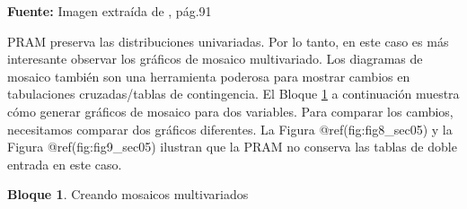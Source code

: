 \documentclass[
]{book}
\theoremstyle{definition}
\theoremstyle{definition}
\newtheorem{example}{Bloque}[chapter]
\theoremstyle{definition}
\theoremstyle{definition}
\theoremstyle{remark}
\begin{document}
\textbf{Fuente:} Imagen extraída de \citep{benschop2021}, pág.91

PRAM preserva las distribuciones univariadas. Por lo tanto, en este caso es más interesante observar los gráficos de mosaico multivariado. Los diagramas de mosaico también son una herramienta poderosa para mostrar cambios en
tabulaciones cruzadas/tablas de contingencia. El Bloque \ref{exm:bloque14lbn} a continuación muestra cómo generar gráficos de mosaico para dos variables. Para comparar los cambios, necesitamos comparar dos gráficos diferentes. La Figura @ref(fig:fig8\_sec05) y la Figura @ref(fig:fig9\_sec05) ilustran que la PRAM no conserva las tablas
de doble entrada en este caso.

\begin{example}
\protect\hypertarget{exm:bloque14lbn}{}\label{exm:bloque14lbn}Creando mosaicos multivariados
\end{example}
\end{document}
